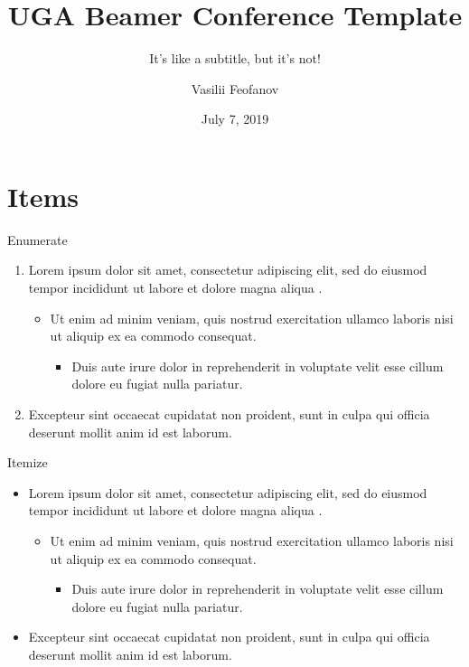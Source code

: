 \documentclass{beamer}
\title{UGA Beamer Conference Template}
\subtitle{It's like a subtitle, but it's not!}
\author[V. Feofanov]{Vasilii Feofanov}
\institute{ Universit\'e Grenoble Alpes, Grenoble INP,\\ LIG, CNRS, Grenoble 38000, France\\ \href{mailto:vasilii.feofanov@univ-grenoble-alpes.fr}{vasilii.feofanov@univ-grenoble-alpes.fr}}
\date{July 7, 2019}
\begin{document}
{
\begin{frame}
  \titlepage
\end{frame}
}
\addtocounter{framenumber}{-1}


\section{Items}
\begin{frame}{Enumerate}
    \begin{enumerate}
        \item Lorem ipsum dolor sit amet, consectetur adipiscing elit, sed do eiusmod tempor incididunt ut labore et dolore magna aliqua \cite{Feofanov:2019}. 
        \begin{itemize}
            \item Ut enim ad minim veniam, quis nostrud exercitation ullamco laboris nisi ut aliquip ex ea commodo consequat.
            \begin{itemize}
            \item Duis aute irure dolor in reprehenderit in voluptate velit esse cillum dolore eu fugiat nulla pariatur. 
            \end{itemize}
        \end{itemize}
        \item Excepteur sint occaecat cupidatat non proident, sunt in culpa qui officia deserunt mollit anim id est laborum.
    \end{enumerate}
\end{frame}

\begin{frame}{Itemize}
    \begin{itemize}
        \item Lorem ipsum dolor sit amet, consectetur adipiscing elit, sed do eiusmod tempor incididunt ut labore et dolore magna aliqua \cite{Feofanov:2019}. 
        \begin{itemize}
            \item Ut enim ad minim veniam, quis nostrud exercitation ullamco laboris nisi ut aliquip ex ea commodo consequat.
            \begin{itemize}
            \item Duis aute irure dolor in reprehenderit in voluptate velit esse cillum dolore eu fugiat nulla pariatur. 
            \end{itemize}
        \end{itemize}
        \item Excepteur sint occaecat cupidatat non proident, sunt in culpa qui officia deserunt mollit anim id est laborum.
    \end{itemize}
\end{frame}
\end{document}
